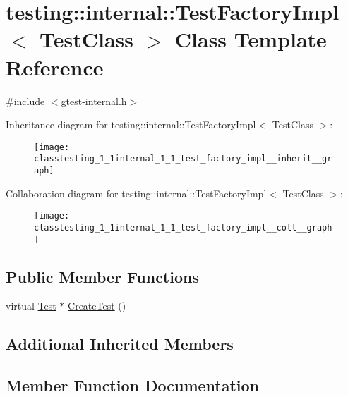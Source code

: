 \hypertarget{classtesting_1_1internal_1_1_test_factory_impl}{}\section{testing\+:\+:internal\+:\+:Test\+Factory\+Impl$<$ Test\+Class $>$ Class Template Reference}
\label{classtesting_1_1internal_1_1_test_factory_impl}


{\ttfamily \#include $<$gtest-\/internal.\+h$>$}



Inheritance diagram for testing\+:\+:internal\+:\+:Test\+Factory\+Impl$<$ Test\+Class $>$\+:
\nopagebreak
\begin{figure}[H]
\begin{center}
\leavevmode
\texttt{[image: classtesting\_1\_1internal\_1\_1\_test\_factory\_impl\_\_inherit\_\_graph]}
\end{center}
\end{figure}


Collaboration diagram for testing\+:\+:internal\+:\+:Test\+Factory\+Impl$<$ Test\+Class $>$\+:
\nopagebreak
\begin{figure}[H]
\begin{center}
\leavevmode
\texttt{[image: classtesting\_1\_1internal\_1\_1\_test\_factory\_impl\_\_coll\_\_graph]}
\end{center}
\end{figure}
\subsection*{Public Member Functions}
\begin{DoxyCompactItemize}
\item 
virtual \hyperlink{classtesting_1_1_test}{Test} $\ast$ \hyperlink{classtesting_1_1internal_1_1_test_factory_impl_a8860c89bdb06450a5d5e8137ebd9d775}{Create\+Test} ()
\end{DoxyCompactItemize}
\subsection*{Additional Inherited Members}


\subsection{Member Function Documentation}
